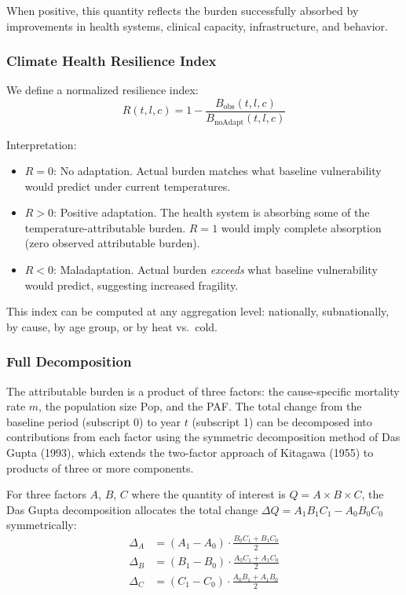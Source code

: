 \documentclass[11pt,a4paper]{article}
\begin{document}
When positive, this quantity reflects the burden successfully absorbed by improvements in health systems, clinical capacity, infrastructure, and behavior.

\subsubsection{Climate Health Resilience Index}

We define a normalized resilience index:
\begin{equation}
  \boxed{\;R(t,l,c) = 1 - \frac{B_{\text{obs}}(t,l,c)}{B_{\text{noAdapt}}(t,l,c)}\;}
  \label{eq:resilience}
\end{equation}

Interpretation:
\begin{itemize}[nosep]
  \item $R = 0$: No adaptation. Actual burden matches what baseline vulnerability would predict under current temperatures.
  \item $R > 0$: Positive adaptation. The health system is absorbing some of the temperature-attributable burden. $R = 1$ would imply complete absorption (zero observed attributable burden).
  \item $R < 0$: Maladaptation. Actual burden \emph{exceeds} what baseline vulnerability would predict, suggesting increased fragility.
\end{itemize}

This index can be computed at any aggregation level: nationally, subnationally, by cause, by age group, or by heat vs.\ cold.

\subsubsection{Full Decomposition}

The attributable burden is a product of three factors: the cause-specific mortality rate $m$, the population size $\text{Pop}$, and the PAF. The total change from the baseline period (subscript 0) to year $t$ (subscript 1) can be decomposed into contributions from each factor using the symmetric decomposition method of Das Gupta (1993), which extends the two-factor approach of Kitagawa (1955) to products of three or more components.

For three factors $A$, $B$, $C$ where the quantity of interest is $Q = A \times B \times C$, the Das Gupta decomposition allocates the total change $\Delta Q = A_1 B_1 C_1 - A_0 B_0 C_0$ symmetrically:
\begin{align}
  \Delta_A &= (A_1 - A_0) \cdot \frac{B_0 C_1 + B_1 C_0}{2} \label{eq:dg_a}\\[0.3em]
  \Delta_B &= (B_1 - B_0) \cdot \frac{A_0 C_1 + A_1 C_0}{2} \label{eq:dg_b}\\[0.3em]
  \Delta_C &= (C_1 - C_0) \cdot \frac{A_0 B_1 + A_1 B_0}{2} \label{eq:dg_c}
\end{align}
\end{document}

